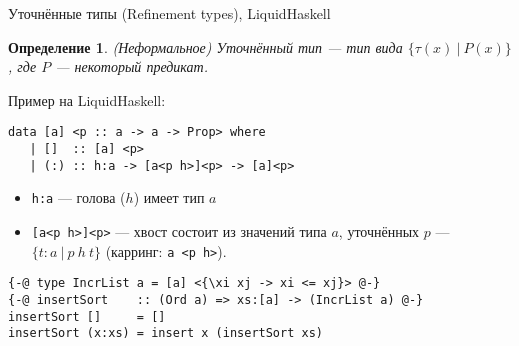 \documentclass[handout]{beamer}
\newtheorem{dfn}{Определение}[section]
\begin{document}
\begin{frame}[fragile]{Уточнённые типы (Refinement types), LiquidHaskell}
\begin{dfn}(Неформальное) Уточнённый тип --- тип вида $\{\tau(x)\ |\ P(x)\}$, где $P$ --- некоторый предикат.\end{dfn}

Пример на LiquidHaskell:
\begin{verbatim}
data [a] <p :: a -> a -> Prop> where
   | []  :: [a] <p>
   | (:) :: h:a -> [a<p h>]<p> -> [a]<p>
\end{verbatim}
\begin{itemize}
\item \verb!h:a! --- голова ($h$) имеет тип $a$\\
\item \verb![a<p h>]<p>! --- хвост состоит из значений типа $a$, уточнённых $p$ --- $\{ t : a\ |\ p\ h\ t\}$ (карринг: \verb!a <p h>!).
\end{itemize}

\begin{verbatim}
{-@ type IncrList a = [a] <{\xi xj -> xi <= xj}> @-}
{-@ insertSort    :: (Ord a) => xs:[a] -> (IncrList a) @-}
insertSort []     = []
insertSort (x:xs) = insert x (insertSort xs) 
\end{verbatim}
\end{frame}
\end{document}
